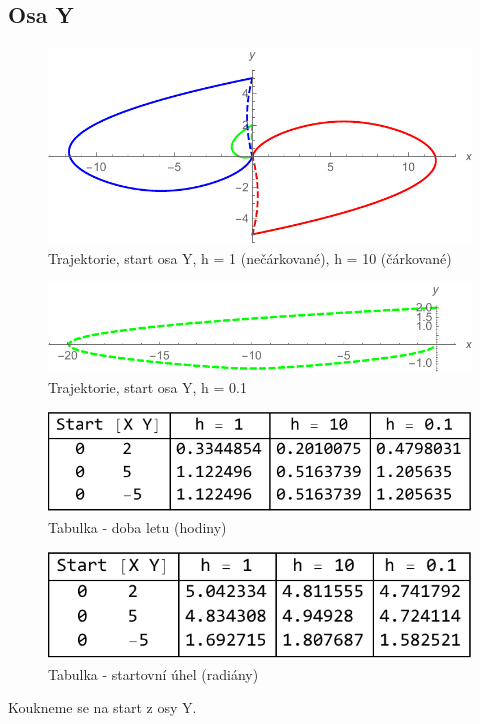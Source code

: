 \documentclass[reqno, a4paper]{amsart}
\numberwithin{equation}{section}
\begin{document}
\subsection{Osa Y}
\label{sec: OsaY}
\begin{figure}
\includegraphics[scale=0.7]{figures/OsaY1.pdf}
\caption{Trajektorie, start osa Y, h = 1 (nečárkované), h = 10 (čárkované)}
\label{Ytraj}
\end{figure}
\begin{figure}
\includegraphics[scale=0.7]{figures/OsaY4.pdf}
\caption{Trajektorie, start osa Y, h = 0.1}
\label{Ytraj0.1}
\end{figure}
\begin{figure}
\includegraphics[scale=0.7]{figures/OsaY - tab. čas.pdf}
\caption{Tabulka - doba letu (hodiny)}
\label{TabY1}
\end{figure}
\begin{figure}
\includegraphics[scale=0.7]{figures/OsaY - tab. beta.pdf}
\caption{Tabulka - startovní úhel (radiány)}
\label{TabY2}
\end{figure}
Koukneme se na start z osy Y.
\end{document}
